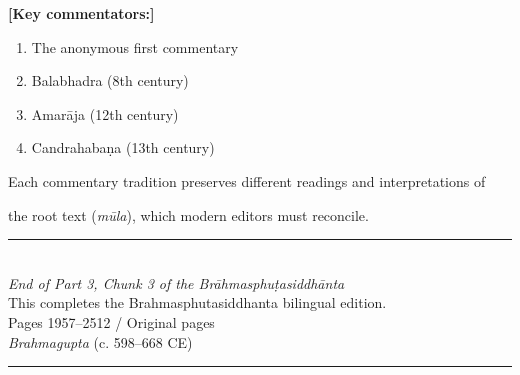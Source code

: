\documentclass[10pt,a4paper]{article}
\newcommand{\shortline}{\noindent\rule{0.5\textwidth}{0.4pt}\par}
\begin{document}
\hfill\vline\hfill%

\begin{minipage}[t]{0.47\textwidth}

\textbf{[Key commentators:]}

\begin{enumerate}

\item The anonymous first commentary

\item Balabhadra (8th century)

\item Amarāja (12th century)

\item Candrahabaṇa (13th century)

\end{enumerate}

Each commentary tradition preserves different readings and interpretations of

the root text (\textit{mūla}), which modern editors must reconcile.

\end{minipage}



\vspace{2em}






\vfill



\begin{center}

\shortline



\vspace{1em}



{\Large\textbf{}}\\[0.8cm]



{\large\textit{End of Part 3, Chunk 3 of the Brāhmasphuṭasiddhānta}}\\[0.3cm]



{\normalsize This completes the Brahmasphutasiddhanta bilingual edition.}\\[0.3cm]



{\small Pages 1957--2512 / Original pages }\\[0.3cm]



{\small\textit{Brahmagupta} (c. 598--668 CE)}



\vspace{1em}

\shortline

\end{center}
\end{document}
